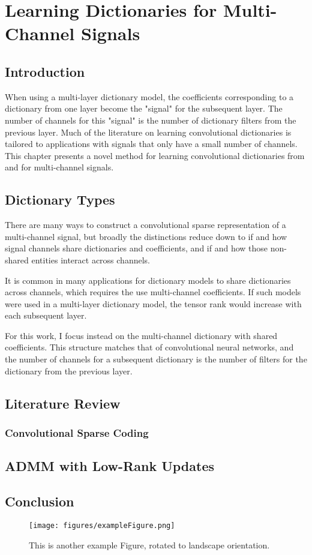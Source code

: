 \chapter{Learning Dictionaries for Multi-Channel Signals}

\section{Introduction}
When using a multi-layer dictionary model, the coefficients corresponding to a dictionary from one layer become the "signal" for the subsequent layer.  The number of channels for this "signal" is the number of dictionary filters from the previous layer.  Much of the literature on learning convolutional dictionaries is tailored to applications with signals that only have a small number of channels.  This chapter presents a novel method for learning convolutional dictionaries from and for multi-channel signals. 
\section{Dictionary Types}
There are many ways to construct a convolutional sparse representation of a multi-channel signal, but broadly the distinctions reduce down to if and how signal channels share dictionaries and coefficients, and if and how those non-shared entities interact across channels.

It is common in many applications for dictionary models to share dictionaries across channels, which requires the use multi-channel coefficients. If such models were used in a multi-layer dictionary model, the tensor rank would increase with each subsequent layer.

For this work, I focus instead on the multi-channel dictionary with shared coefficients. This structure matches that of convolutional neural networks, and the number of channels for a subsequent dictionary is the number of filters for the dictionary from the previous layer.

\section{Literature Review}
\subsection{Convolutional Sparse Coding}
\section{ADMM with Low-Rank Updates}
\section{Conclusion}

\begin{sidewaysfigure}
\texttt{[image: figures/exampleFigure.png]}
\caption{This is another example Figure, rotated to landscape orientation.}
\label{LandscapeFigure}
\end{sidewaysfigure}
